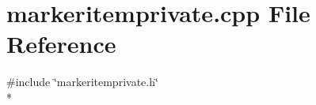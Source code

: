 \section{markeritemprivate.\+cpp File Reference}
\label{bk3_2items_2markeritemprivate_8cpp}
{\ttfamily \#include \char`\"{}markeritemprivate.\+h\char`\"{}}\\*
